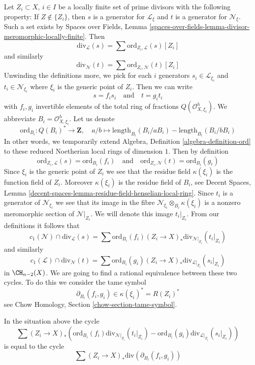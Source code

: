 \medskip\noindent
Let $Z_i \subset X$, $i \in I$ be a locally finite set of prime divisors
with the following property: If $Z \not \in \{Z_i\}$, then $s$ is a
generator for $\mathcal{L}_\xi$ and $t$ is a generator for $\mathcal{N}_\xi$.
Such a set exists by Spaces over Fields, Lemma
\ref{spaces-over-fields-lemma-divisor-meromorphic-locally-finite}.
Then
$$
\text{div}_\mathcal{L}(s) = \sum \text{ord}_{Z_i, \mathcal{L}}(s) [Z_i]
$$
and similarly
$$
\text{div}_\mathcal{N}(t) = \sum \text{ord}_{Z_i, \mathcal{N}}(t) [Z_i]
$$
Unwinding the definitions more, we pick for each $i$ generators
$s_i \in \mathcal{L}_{\xi_i}$ and $t_i \in \mathcal{N}_{\xi_i}$
where $\xi_i$ is the generic point of $Z_i$. Then we can write
$$
s = f_i s_i
\quad\text{and}\quad
t = g_i t_i
$$
with $f_i, g_i$ invertible elements of the total ring of fractions
$Q(\mathcal{O}_{X, \xi_i}^h)$. We abbreviate $B_i = \mathcal{O}_{X, \xi_i}^h$.
Let us denote
$$
\text{ord}_{B_i} : Q(B_i)^* \longrightarrow \mathbf{Z},\quad
a/b \longmapsto
\text{length}_{B_i}(B_i/aB_i) - \text{length}_{B_i}(B_i/bB_i)
$$
In other words, we temporarily extend
Algebra, Definition \ref{algebra-definition-ord}
to these reduced Noetherian local rings of dimension $1$.
Then by definition
$$
\text{ord}_{Z_i, \mathcal{L}}(s) = \text{ord}_{B_i}(f_i)
\quad\text{and}\quad
\text{ord}_{Z_i, \mathcal{N}}(t) = \text{ord}_{B_i}(g_i)
$$
Since $\xi_i$ is the generic point of $Z_i$ we see that
the residue field $\kappa(\xi_i)$ is the function field of $Z_i$.
Moreover $\kappa(\xi_i)$ is the residue field of $B_i$, see
Decent Spaces, Lemma
\ref{decent-spaces-lemma-residue-field-henselian-local-ring}.
Since $t_i$ is a generator of $\mathcal{N}_{\xi_i}$ we see that
its image in the fibre $\mathcal{N}_{\xi_i} \otimes_{B_i} \kappa(\xi_i)$
is a nonzero meromorphic section of $\mathcal{N}|_{Z_i}$. We will denote
this image $t_i|_{Z_i}$. From our definitions it follows that
$$
c_1(\mathcal{N}) \cap \text{div}_\mathcal{L}(s) =
\sum \text{ord}_{B_i}(f_i)
(Z_i \to X)_*\text{div}_{\mathcal{N}|_{Z_i}}(t_i|_{Z_i})
$$
and similarly
$$
c_1(\mathcal{L}) \cap \text{div}_\mathcal{N}(t) =
\sum \text{ord}_{B_i}(g_i)
(Z_i \to X)_*\text{div}_{\mathcal{L}|_{Z_i}}(s_i|_{Z_i})
$$
in $\CH_{n - 2}(X)$. We are going to find a rational equivalence between
these two cycles. To do this we consider the tame symbol
$$
\partial_{B_i}(f_i, g_i) \in \kappa(\xi_i)^* = R(Z_i)^*
$$
see Chow Homology, Section \ref{chow-section-tame-symbol}.

\begin{lemma}
\label{lemma-key-formula}
In the situation above the cycle
$$
\sum
(Z_i \to X)_*\left(
\text{ord}_{B_i}(f_i) \text{div}_{\mathcal{N}|_{Z_i}}(t_i|_{Z_i}) -
\text{ord}_{B_i}(g_i) \text{div}_{\mathcal{L}|_{Z_i}}(s_i|_{Z_i}) \right)
$$
is equal to the cycle
$$
\sum (Z_i \to X)_*\text{div}(\partial_{B_i}(f_i, g_i))
$$
\end{lemma}

